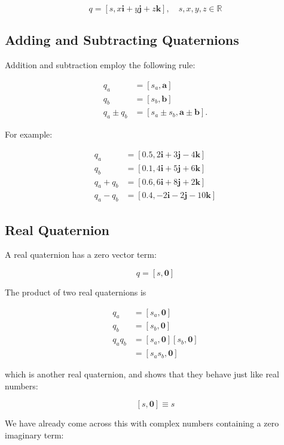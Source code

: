 \documentclass[10pt]{article}
\begin{document}
$$
q=[s, x \mathbf{i}+y \mathbf{j}+z \mathbf{k}], \quad s, x, y, z \in \mathbb{R}
$$

\subsection{Adding and Subtracting Quaternions}
Addition and subtraction employ the following rule:

$$
\begin{aligned}
q_{a} & =\left[s_{a}, \mathbf{a}\right] \\
q_{b} & =\left[s_{b}, \mathbf{b}\right] \\
q_{a} \pm q_{b} & =\left[s_{a} \pm s_{b}, \mathbf{a} \pm \mathbf{b}\right] .
\end{aligned}
$$

For example:

$$
\begin{aligned}
q_{a} & =[0.5,2 \mathbf{i}+3 \mathbf{j}-4 \mathbf{k}] \\
q_{b} & =[0.1,4 \mathbf{i}+5 \mathbf{j}+6 \mathbf{k}] \\
q_{a}+q_{b} & =[0.6,6 \mathbf{i}+8 \mathbf{j}+2 \mathbf{k}] \\
q_{a}-q_{b} & =[0.4,-2 \mathbf{i}-2 \mathbf{j}-10 \mathbf{k}]
\end{aligned}
$$

\subsection{Real Quaternion}
A real quaternion has a zero vector term:

$$
q=[s, \mathbf{0}]
$$

The product of two real quaternions is

$$
\begin{aligned}
q_{a} & =\left[s_{a}, \mathbf{0}\right] \\
q_{b} & =\left[s_{b}, \mathbf{0}\right] \\
q_{a} q_{b} & =\left[s_{a}, \mathbf{0}\right]\left[s_{b}, \mathbf{0}\right] \\
& =\left[s_{a} s_{b}, \mathbf{0}\right]
\end{aligned}
$$

which is another real quaternion, and shows that they behave just like real numbers:

$$
[s, \mathbf{0}] \equiv s
$$

We have already come across this with complex numbers containing a zero imaginary term:
\end{document}
